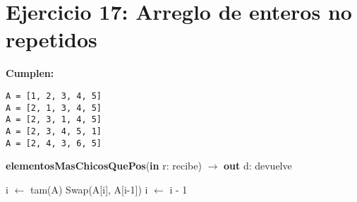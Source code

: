 \section{Ejercicio 17: Arreglo de enteros no repetidos}
\textbf{Cumplen:}
\begin{lstlisting}
A = [1, 2, 3, 4, 5]
A = [2, 1, 3, 4, 5]
A = [2, 3, 1, 4, 5]
A = [2, 3, 4, 5, 1]
A = [2, 4, 3, 6, 5]
\end{lstlisting}

\begin{algorithm}[H]
\caption{
    \textbf{elementosMasChicosQuePos}(\textbf{in} r: recibe) $\to$ \textbf{out} d: devuelve
}
    \begin{algorithmic}[1]
        \State i $\gets$ tam(A)
                \State Swap(A[i], A[i-1])
            \EndIf
            \State i $\gets$ i - 1
        \EndWhile
    \end{algorithmic}
\end{algorithm}